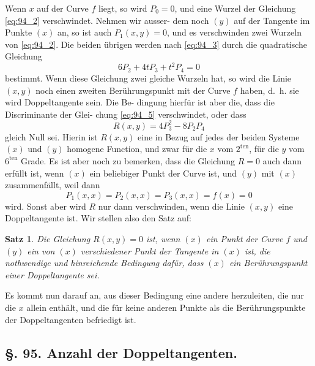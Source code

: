 \documentclass[12pt,a4paper]{article}
\theoremstyle{plain}
\newtheorem{satz}{Satz}[section]
\theoremstyle{definition}
\theoremstyle{remark}
\begin{document}
Wenn $x$ auf der Curve $f$ liegt, so wird $P_0 = 0$, und eine
Wurzel der Gleichung \eqref{eq:94_2} verschwindet. Nehmen wir ausser-
dem noch $(y)$ auf der Tangente im Punkte $(x)$ an, so ist auch
$P_1(x, y) = 0$, und es verschwinden zwei Wurzeln von \eqref{eq:94_2}. Die
beiden übrigen werden nach \eqref{eq:94_3} durch die quadratische Gleichung
\begin{equation}\label{eq:94_5}
6P_2 + 4t P_3 + t^2 P_4 = 0
\end{equation}
bestimmt. Wenn diese Gleichung zwei gleiche Wurzeln hat, so
wird die Linie $(x, y)$ noch einen zweiten Berührungspunkt mit
der Curve $f$ haben, d.~h. sie wird Doppeltangente sein. Die Be-
dingung hierfür ist aber die, dass die Discriminante der Glei-
chung \eqref{eq:94_5} verschwindet, oder dass
\begin{equation}\label{eq:94_6}
R(x, y) = 4P_3^2 - 8P_2 P_4
\end{equation}
gleich Null sei. Hierin ist $R(x, y)$ eine in Bezug auf jedes der
beiden Systeme $(x)$ und $(y)$ homogene Function, und zwar für
die $x$ vom $2^{\text{ten}}$, für die $y$ vom $6^{\text{ten}}$ Grade. Es ist aber noch zu
bemerken, dass die Gleichung $R = 0$ auch dann erfüllt ist,
wenn $(x)$ ein beliebiger Punkt der Curve ist, und $(y)$ mit $(x)$
zusammenfällt, weil dann
\begin{equation*}
P_1(x, x) = P_2(x, x) = P_3(x, x) = f(x) = 0
\end{equation*}
wird. Sonst aber wird $R$ nur dann verschwinden, wenn die Linie
$(x, y)$ eine Doppeltangente ist. Wir stellen also den Satz auf:

\begin{satz}
Die Gleichung $R(x,y) = 0$ ist, wenn $(x)$ ein Punkt
der Curve $f$ und $(y)$ ein von $(x)$ verschiedener
Punkt der Tangente in $(x)$ ist, die nothwendige
und hinreichende Bedingung dafür, dass $(x)$ ein
Berührungspunkt einer Doppeltangente sei.
\end{satz}

Es kommt nun darauf an, aus dieser Bedingung eine andere
herzuleiten, die nur die $x$ allein enthält, und die für keine
anderen Punkte als die Berührungspunkte der Doppeltangenten
befriedigt ist.

\subsection*{§. 95. Anzahl der Doppeltangenten.}
\end{document}
